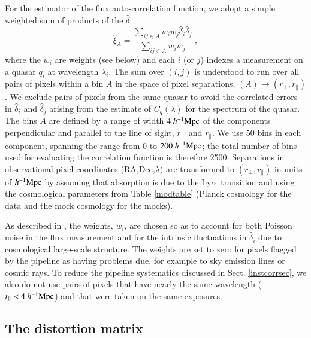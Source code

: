 \documentclass{aa}
\newcommand{\xifhat}{\hat{\xi}}
\newcommand{\dhat}{\hat\delta}
\newcommand{\hMpc}{h^{-1}{\rm Mpc}}
\newcommand{\Lya}{Ly$\alpha$~}
\newcommand{\rperp}{r_\perp}
\newcommand{\rpar}{r_\parallel}
\begin{document}
For the estimator of the  flux auto-correlation function, we adopt 
a simple weighted sum of products of the $\dhat$:
 \begin{equation}
 \xifhat_A=\frac{\sum_{ij\in A}w_iw_j\dhat_i\dhat_j}{\sum_{ij\in A}w_iw_j}
\; ,
\label{xiautoestimator}
 \end{equation}
where the $w_i$ are weights (see below)
and each $i$ (or $j$) indexes
a measurement on a quasar $q_i$ at wavelength $\lambda_i$.
The sum over $(i,j)$ is understood to run over 
all pairs of pixels 
within 
a bin $A$ in the space of pixel separations, 
$(A)\rightarrow(\rperp,\rpar)$.
We exclude pairs of pixels from the same quasar 
to avoid the correlated errors in $\dhat_i$ and $\dhat_j$ 
arising from the estimate of $C_q(\lambda)$
for the spectrum of the  quasar.
The bins $A$ are  defined by a range of width $4~\hMpc$
of the components perpendicular and parallel to the line of sight,
$\rperp$ and $\rpar$.  
We use 50 bins in each component, spanning the range
from $0$ to $200~\hMpc$; the total number of bins used for 
evaluating the correlation function is therefore 2500.
Separations in observational pixel coordinates
(RA,Dec,$\lambda$) are transformed
to $(\rperp,\rpar)$ in units of $\hMpc$ by
assuming that absorption is due to the \Lya transition and 
using the cosmological parameters from Table \ref{modtable}
(Planck cosmology for the data
and the mock cosmology for the mocks).




As described in  \citet{2015A&A...574A..59D},
the weights, $w_i$, are chosen so as to account for both 
Poisson noise  in the flux measurement and for
the intrinsic fluctuations in $\dhat_i$ due to cosmological
large-scale structure.
The weights are set to zero for 
pixels flagged by the pipeline as having problems due, for example 
to sky emission lines or cosmic rays.
To reduce the pipeline systematics discussed in Sect. \ref{instcorrsec},
we also do not use pairs of pixels that have
nearly the same wavelength ($\rpar<4~\hMpc$) and that were
taken on the same exposures.


\subsection{The distortion matrix}
\label{distortionsec}
\end{document}
